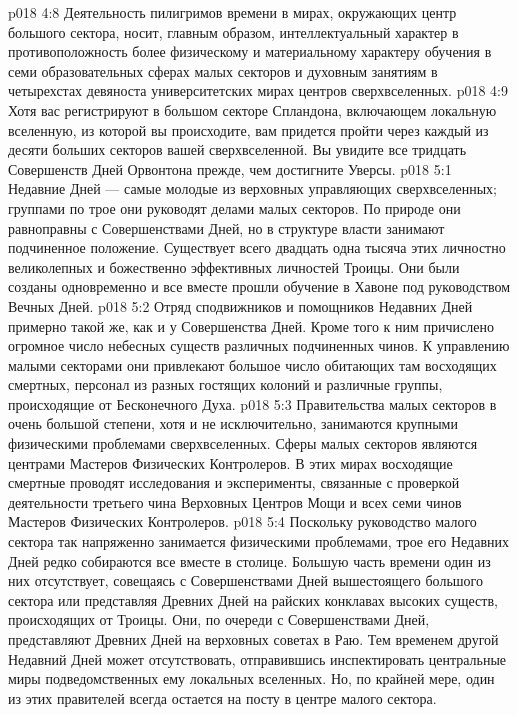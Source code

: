 \vs p018 4:8 Деятельность пилигримов времени в мирах, окружающих центр большого сектора, носит, главным образом, интеллектуальный характер в противоположность более физическому и материальному характеру обучения в семи образовательных сферах малых секторов и духовным занятиям в четырехстах девяноста университетских мирах центров сверхвселенных.
\vs p018 4:9 Хотя вас регистрируют в большом секторе Спландона, включающем локальную вселенную, из которой вы происходите, вам придется пройти через каждый из десяти больших секторов вашей сверхвселенной. Вы увидите все тридцать Совершенств Дней Орвонтона прежде, чем достигните Уверсы.
\vs p018 5:1 Недавние Дней --- самые молодые из верховных управляющих сверхвселенных; группами по трое они руководят делами малых секторов. По природе они равноправны с Совершенствами Дней, но в структуре власти занимают подчиненное положение. Существует всего двадцать одна тысяча этих личностно великолепных и божественно эффективных личностей Троицы. Они были созданы одновременно и все вместе прошли обучение в Хавоне под руководством Вечных Дней.
\vs p018 5:2 Отряд сподвижников и помощников Недавних Дней примерно такой же, как и у Совершенства Дней. Кроме того к ним причислено огромное число небесных существ различных подчиненных чинов. К управлению малыми секторами они привлекают большое число обитающих там восходящих смертных, персонал из разных гостящих колоний и различные группы, происходящие от Бесконечного Духа.
\vs p018 5:3 Правительства малых секторов в очень большой степени, хотя и не исключительно, занимаются крупными физическими проблемами сверхвселенных. Сферы малых секторов являются центрами Мастеров Физических Контролеров. В этих мирах восходящие смертные проводят исследования и эксперименты, связанные с проверкой деятельности третьего чина Верховных Центров Мощи и всех семи чинов Мастеров Физических Контролеров.
\vs p018 5:4 Поскольку руководство малого сектора так напряженно занимается физическими проблемами, трое его Недавних Дней редко собираются все вместе в столице. Большую часть времени один из них отсутствует, совещаясь с Совершенствами Дней вышестоящего большого сектора или представляя Древних Дней на райских конклавах высоких существ, происходящих от Троицы. Они, по очереди с Совершенствами Дней, представляют Древних Дней на верховных советах в Раю. Тем временем другой Недавний Дней может отсутствовать, отправившись инспектировать центральные миры подведомственных ему локальных вселенных. Но, по крайней мере, один из этих правителей всегда остается на посту в центре малого сектора.
